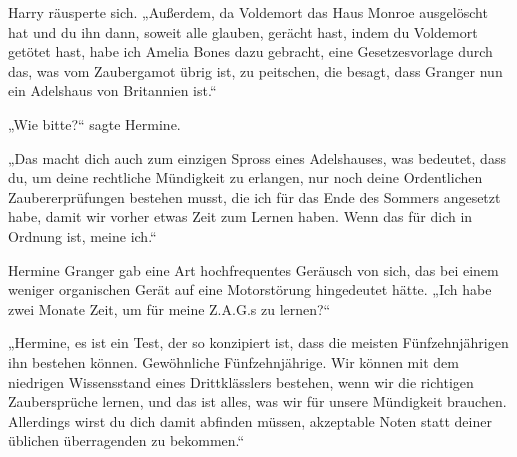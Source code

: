 Harry räusperte sich.
„Außerdem, da Voldemort das Haus Monroe ausgelöscht hat und du ihn dann, soweit alle glauben, gerächt hast, indem du Voldemort getötet hast, habe ich Amelia Bones dazu gebracht, eine Gesetzesvorlage durch das, was vom Zaubergamot übrig ist, zu peitschen, die besagt, dass Granger nun ein Adelshaus von Britannien ist.“

„Wie bitte?“ sagte Hermine.

„Das macht dich auch zum einzigen Spross eines Adelshauses, was bedeutet, dass du, um deine rechtliche Mündigkeit zu erlangen, nur noch deine Ordentlichen Zaubererprüfungen bestehen musst, die ich für das Ende des Sommers angesetzt habe, damit wir vorher etwas Zeit zum Lernen haben. Wenn das für dich in Ordnung ist, meine ich.“

Hermine Granger gab eine Art hochfrequentes Geräusch von sich, das bei einem weniger organischen Gerät auf eine Motorstörung hingedeutet hätte.
„Ich habe zwei Monate Zeit, um für meine Z.A.G.s zu lernen?“

„Hermine, es ist ein Test, der so konzipiert ist, dass die meisten Fünfzehnjährigen ihn bestehen können. Gewöhnliche Fünfzehnjährige. Wir können mit dem niedrigen Wissensstand eines Drittklässlers bestehen, wenn wir die richtigen Zaubersprüche lernen, und das ist alles, was wir für unsere Mündigkeit brauchen. Allerdings wirst du dich damit abfinden müssen, akzeptable Noten statt deiner üblichen überragenden zu bekommen.“


